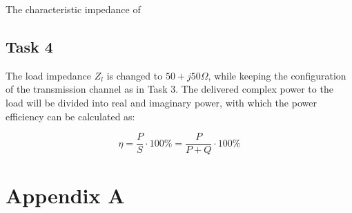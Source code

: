 \documentclass[final]{scrreprt} %
\begin{document}
The characteristic impedance of 

\section{Task 4}
The load impedance $Z_l$ is changed to $50 + j50 \Omega$, while keeping the configuration of the transmission channel as in Task 3. The delivered complex power to the load will be divided into real and imaginary power, with which the power efficiency can be calculated as:

\begin{equation}
	\eta = \frac{P}{S} \cdot 100\% = \frac{P}{P + Q} \cdot 100\%
\end{equation}

\iffalse
\begin{figure}[H]
	\centering
	\setlength\figureheight{4cm}
    	\setlength\figurewidth{0.8\linewidth}
	
	\label{fig:wheel-torque-labcar}
	\caption{Breakdown of the delivered powers.}
\end{figure}

\begin{figure}[H]
	\centering
	\setlength\figureheight{4cm}
    	\setlength\figurewidth{0.8\linewidth}
	
	\label{fig:wheel-torque-labcar}
	\caption{Power efficiency.}
\end{figure}
\fi

\chapter*{Appendix A}
\end{document}
